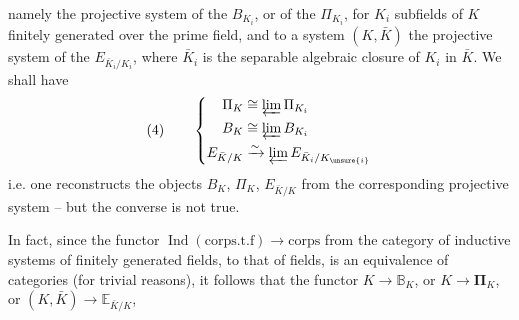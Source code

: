 namely the projective system of the $B_{K_i}$, or of the $\Pi_{K_i}$, for $K_i$ subfields of $K$ finitely generated over the prime field, and to a system $(K,\bar K)$ the projective system of the $E_{\bar K_i/K_i}$, where $\bar K_i$ is the separable algebraic closure of $K_i$ in $\bar K$. We shall have
\[
(4)\qquad\left\{\begin{aligned}
\Pi_K&\cong\varprojlim\Pi_{K_i}\\
B_K&\cong\varprojlim B_{K_i}\\
E_{\bar K/K}&\xrightarrow{\sim}\varprojlim E_{\bar K_i/K_{\unsure{i}}}
\end{aligned}\right.
\]
i.e. one reconstructs the objects $B_K$, $\Pi_K$, $E_{\bar K/K}$ from the corresponding projective system -- but the converse is not true.

In fact, since the functor $\operatorname{Ind}(\text{corps.t.f})\longrightarrow\text{corps}$ from the category of inductive systems of finitely generated fields, to that of fields, is an equivalence of categories (for trivial reasons), it follows that the functor $K\longrightarrow\mathbb{B}_K$, or $K\longrightarrow\boldsymbol{\Pi}_K$, or $(K,\bar K)\longrightarrow\mathbb{E}_{\bar K/K}$, 
